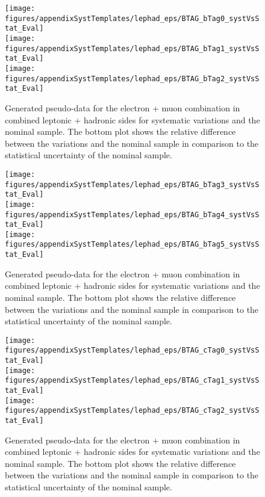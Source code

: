 \begin{figure}[!hb]
\begin{center}
        \texttt{[image: figures/appendixSystTemplates/lephad\_eps/BTAG\_bTag0\_systVsStat\_Eval]}\\
        \texttt{[image: figures/appendixSystTemplates/lephad\_eps/BTAG\_bTag1\_systVsStat\_Eval]}\\
        \texttt{[image: figures/appendixSystTemplates/lephad\_eps/BTAG\_bTag2\_systVsStat\_Eval]}
  
        \caption{Generated pseudo-data for the electron + muon combination in combined leptonic + hadronic sides for systematic variations and the nominal \ttbar sample. The bottom plot shows the relative difference between the variations and the nominal sample in comparison to the statistical uncertainty of the nominal sample.}   
        \label{fig:systematicVar_lephad_Btag_1_1}
        \end{center}                          
        \end{figure}

\begin{figure}[!hb]
\begin{center}
        \texttt{[image: figures/appendixSystTemplates/lephad\_eps/BTAG\_bTag3\_systVsStat\_Eval]}\\
        \texttt{[image: figures/appendixSystTemplates/lephad\_eps/BTAG\_bTag4\_systVsStat\_Eval]}\\
        \texttt{[image: figures/appendixSystTemplates/lephad\_eps/BTAG\_bTag5\_systVsStat\_Eval]}
  
        \caption{Generated pseudo-data for the electron + muon combination in combined leptonic + hadronic sides for systematic variations and the nominal \ttbar sample. The bottom plot shows the relative difference between the variations and the nominal sample in comparison to the statistical uncertainty of the nominal sample.}   
        \label{fig:systematicVar_lephad_Btag_1_2}
        \end{center}                          
        \end{figure}
\begin{figure}[!hb]
\begin{center}
        \texttt{[image: figures/appendixSystTemplates/lephad\_eps/BTAG\_cTag0\_systVsStat\_Eval]}\\
        \texttt{[image: figures/appendixSystTemplates/lephad\_eps/BTAG\_cTag1\_systVsStat\_Eval]}\\
        \texttt{[image: figures/appendixSystTemplates/lephad\_eps/BTAG\_cTag2\_systVsStat\_Eval]}
  
        \caption{Generated pseudo-data for the electron + muon combination in combined leptonic + hadronic sides for systematic variations and the nominal \ttbar sample. The bottom plot shows the relative difference between the variations and the nominal sample in comparison to the statistical uncertainty of the nominal sample.}   
        \label{fig:systematicVar_lephad_Btag_2_1}
        \end{center}                          
        \end{figure}


